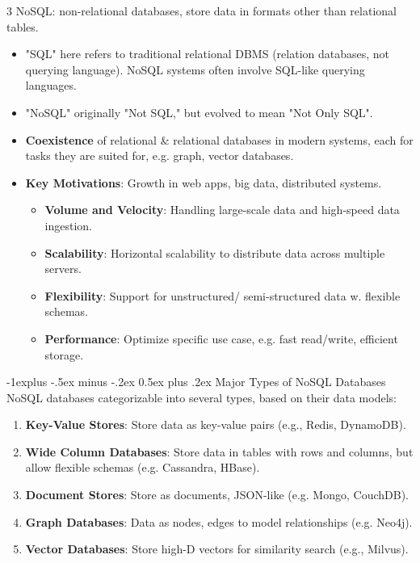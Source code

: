 \documentclass[a4paper, 9pt, landscape]{article}
\makeatletter
\renewcommand{\subsection}{\@startsection{subsection}{2}{0mm}%
                                {-1explus -.5ex minus -.2ex}%
                                {0.5ex plus .2ex}%
                                {\normalfont\normalsize\bfseries}}
\makeatother
\begin{document}
\begin{multicols*}{3}
NoSQL: non-relational databases, store data in formats other than relational tables. 
\begin{itemize}
\item "SQL" here refers to traditional relational DBMS (relation databases, not querying language). NoSQL systems often involve SQL-like querying languages.
\item "NoSQL" originally "Not SQL," but evolved to mean "Not Only SQL".
\item \textbf{Coexistence} of relational \& relational databases in modern systems, each for tasks they are suited for, e.g. graph, vector databases.
\item \textbf{Key Motivations}: Growth in web apps, big data, distributed systems. 
	\begin{itemize}
	\item \textbf{Volume and Velocity}: Handling large-scale data and high-speed data ingestion.
	\item \textbf{Scalability}: Horizontal scalability to distribute data across multiple servers.
	\item \textbf{Flexibility}: Support for unstructured/ semi-structured data w. flexible schemas.
	\item \textbf{Performance}: Optimize specific use case, e.g. fast read/write, efficient storage.
	\end{itemize}
\end{itemize}

\subsection{Major Types of NoSQL Databases}
NoSQL databases categorizable into several types, based on their data models:
\begin{enumerate}[itemsep=0pt]
    \item \textbf{Key-Value Stores}: Store data as key-value pairs (e.g., Redis, DynamoDB).
    \item \textbf{Wide Column Databases}: Store data in tables with rows and columns, but allow flexible schemas (e.g. Cassandra, HBase).
    \item \textbf{Document Stores}: Store as documents, JSON-like (e.g. Mongo, CouchDB).
    \item \textbf{Graph Databases}: Data as nodes, edges to model relationships (e.g. Neo4j).
    \item \textbf{Vector Databases}: Store high-D vectors for similarity search (e.g., Milvus).
\end{enumerate}


\end{multicols*}
\end{document}
